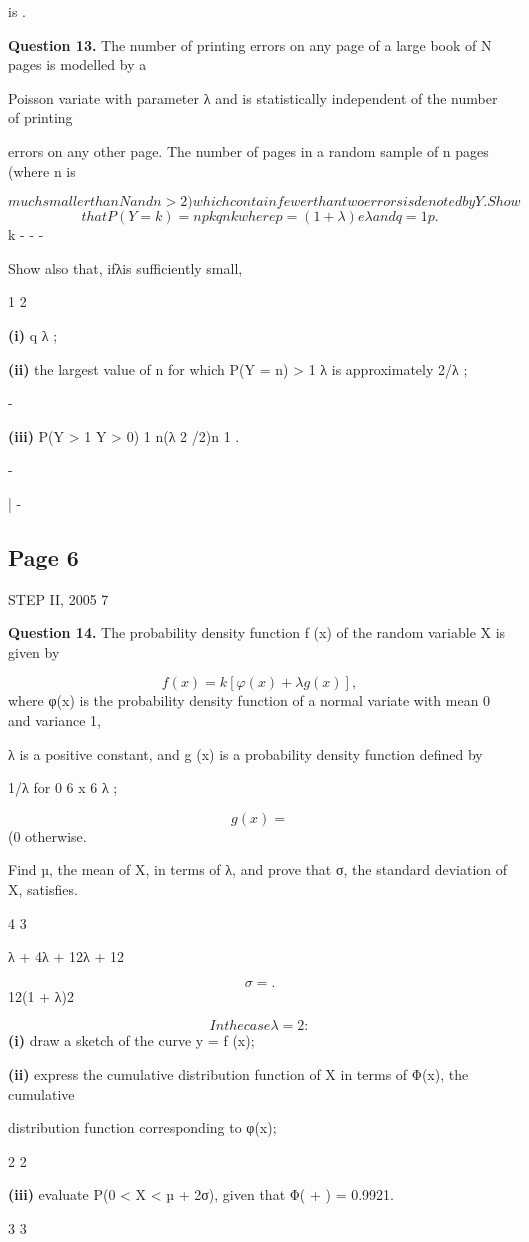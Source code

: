 \documentclass[12pt]{article}
\begin{document}
\begin{flushleft}
is .\par
\bigskip\textbf{Question 13.} The number of printing errors on any page of a large book of N pages is modelled by a\par
Poisson variate with parameter λ and is statistically independent of the number of printing\par
errors on any other page. The number of pages in a random sample of n pages (where n is\par
\[much smaller than N and n > 2) which contain fewer than two errors is denoted by Y . Show\]
\[that P(Y = k) = n pkqn k where p = (1 + λ)e λ and q = 1 p .\]
k - - -\par
Show also that, ifλis sufficiently small,\par
1 2\par
\textbf{(i)} q λ ;\par
\approx\par
\textbf{(ii)} the largest value of n for which P(Y = n) > 1 λ is approximately 2/λ ;\par
-\par
\textbf{(iii)} P(Y > 1 Y > 0) 1 n(λ 2 /2)n 1 .\par
-\par
| \approx -\par
\end{flushleft}
\subsection*{Page 6}
\begin{flushleft}
STEP II, 2005 7\par
\bigskip\textbf{Question 14.} The probability density function f (x) of the random variable X is given by\par
\[f (x) = k [φ(x) + λg (x)] ,\]
where φ(x) is the probability density function of a normal variate with mean 0 and variance 1,\par
λ is a positive constant, and g (x) is a probability density function defined by\par
1/λ for 0 6 x 6 λ ;\par
\[g (x) =\]
(0 otherwise.\par
Find µ, the mean of X, in terms of λ, and prove that σ, the standard deviation of X, satisfies.\par
4 3\par
λ + 4λ + 12λ + 12\par
\[σ = .\]
12(1 + λ)2\par
\[In the case λ = 2:\]
\textbf{(i)} draw a sketch of the curve y = f (x);\par
\textbf{(ii)} express the cumulative distribution function of X in terms of Φ(x), the cumulative\par
distribution function corresponding to φ(x);\par
2 2\par
\textbf{(iii)} evaluate P(0 < X < µ + 2σ), given that Φ( + ) = 0.9921.\par
3 3\par
\end{flushleft}
\end{document}
